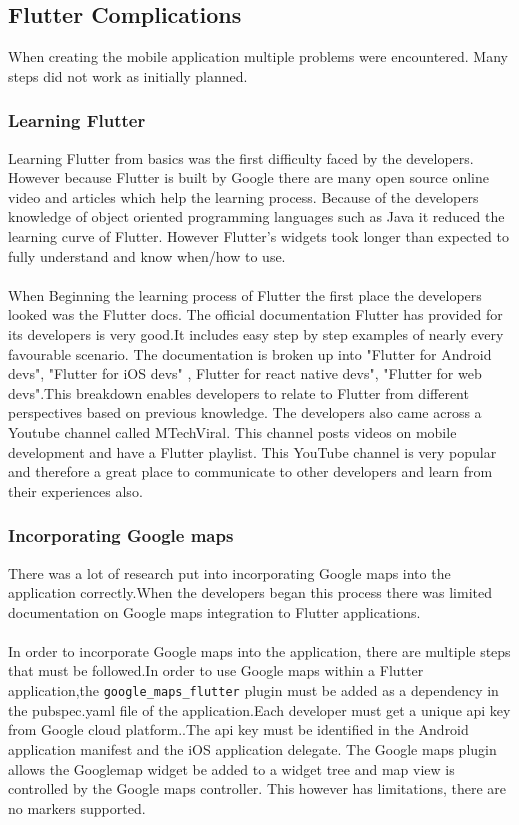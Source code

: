 \subsection{Flutter Complications}
When creating the mobile application multiple problems were encountered. Many steps did not work as initially planned.
\subsubsection{Learning Flutter}
Learning Flutter from basics was the first difficulty faced by the developers. However because Flutter is built by Google there are many open source online video and articles which help the learning process. Because of the developers knowledge of object oriented programming languages such as Java it reduced the learning curve of Flutter. However Flutter's widgets took longer than expected to fully understand and know when/how to use.
\paragraph{}When Beginning the learning process of Flutter the first place the developers looked was the Flutter docs.\cite{flutterdocs} The official documentation Flutter has provided for its developers is very good.It includes easy step by step examples of nearly every favourable scenario. The documentation is broken up into "Flutter for Android devs", "Flutter for iOS devs" , Flutter for react native devs", "Flutter for web devs".This breakdown enables developers to relate to Flutter from different perspectives based on previous knowledge. The developers also came across a Youtube channel called MTechViral.\cite{channel_youtube} This channel posts videos on mobile development and have a Flutter playlist. This YouTube channel is very popular and therefore a great place to communicate to other developers and learn from their experiences also.

\subsubsection{Incorporating Google maps}
There was a lot of research put into incorporating Google maps into the application correctly.When the developers began this process there was limited documentation on Google maps integration to Flutter applications.
\paragraph{}In order to incorporate Google maps into the application, there are multiple steps that must be followed.In order to use Google maps within a Flutter application,the \texttt{google\_maps\_flutter} plugin must be added as a dependency in the pubspec.yaml file of the application.Each developer must get a unique api key from Google cloud platform.\cite{googleCloudMap}.The api key must be identified in the Android application manifest and the iOS application delegate. The Google maps plugin allows the Googlemap widget be added to a widget tree and map view is controlled by the Google maps controller. This however has limitations, there are no markers supported.

